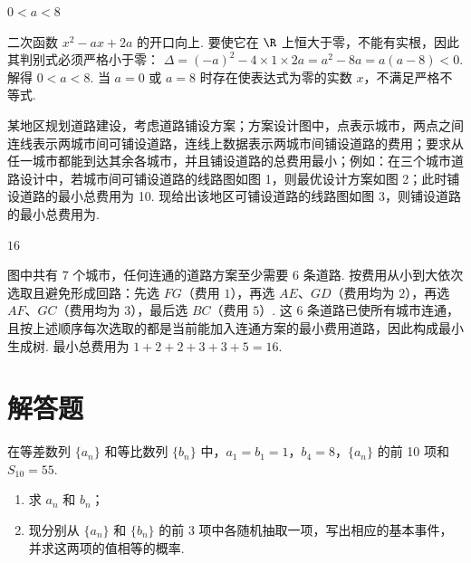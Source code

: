 \begin{answer}
\(0 < a < 8\)
\end{answer}

\begin{solution}
二次函数 \(x^2-ax+2a\) 的开口向上. 要使它在 \(\R\) 上恒大于零，不能有实根，因此其判别式必须严格小于零：
\(\Delta=(-a)^2-4\times1\times2a=a^2-8a=a(a-8)<0\). 解得 \(0<a<8\). 当 \(a=0\) 或 \(a=8\) 时存在使表达式为零的实数 \(x\)，不满足严格不等式.
\end{solution}

\begin{problem}
某地区规划道路建设，考虑道路铺设方案；方案设计图中，点表示城市，两点之间连线表示两城市间可铺设道路，连线上数据表示两城市间铺设道路的费用；要求从任一城市都能到达其余各城市，并且铺设道路的总费用最小；例如：在三个城市道路设计中，若城市间可铺设道路的线路图如图 1，则最优设计方案如图 2；此时铺设道路的最小总费用为 10. 现给出该地区可铺设道路的线路图如图 3，则铺设道路的最小总费用为\fillinblank{}.

\end{problem}

\begin{answer}
\(16\)
\end{answer}

\begin{solution}
图中共有 \(7\) 个城市，任何连通的道路方案至少需要 \(6\) 条道路. 按费用从小到大依次选取且避免形成回路：先选 \(FG\)（费用 \(1\)），再选 \(AE\)、\(GD\)（费用均为 \(2\)），再选 \(AF\)、\(GC\)（费用均为 \(3\)），最后选 \(BC\)（费用 \(5\)）. 这 \(6\) 条道路已使所有城市连通，且按上述顺序每次选取的都是当前能加入连通方案的最小费用道路，因此构成最小生成树. 最小总费用为 \(1+2+2+3+3+5=16\).
\end{solution}

\section{解答题}

\begin{problem}
在等差数列 \(\{a_{n}\}\) 和等比数列 \(\{b_{n}\}\) 中，\(a_{1} = b_{1} = 1\)，\(b_{4} = 8\)，\(\{a_{n}\}\) 的前 10 项和 \(S_{10} = 55\).
\begin{enumerate}
\item 求 \(a_{n}\) 和 \(b_{n}\)；
\item 现分别从 \( \{a_{n}\} \) 和 \( \{b_{n}\} \) 的前 3 项中各随机抽取一项，写出相应的基本事件，并求这两项的值相等的概率.
\end{enumerate}
\end{problem}

